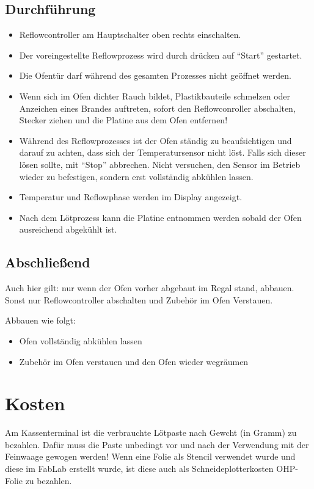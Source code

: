 \documentclass{\basedir/fablab-document}
\begin{document}
\subsection{Durchführung}
\begin{itemize}
	\item Reflowcontroller am Hauptschalter oben rechts einschalten.
	\item Der voreingestellte Reflowprozess wird durch drücken auf \enquote{Start} gestartet.
	\item Die Ofentür darf während des gesamten Prozesses nicht geöffnet werden.
	\item Wenn sich im Ofen dichter Rauch bildet, Plastikbauteile schmelzen oder Anzeichen eines Brandes auftreten, sofort den Reflowconroller abschalten, Stecker ziehen und die Platine aus dem Ofen entfernen!
	\item Während des Reflowprozesses ist der Ofen ständig zu beaufsichtigen und darauf zu achten, dass sich der Temperatursensor nicht löst. Falls sich dieser lösen sollte, mit \enquote{Stop} abbrechen. Nicht versuchen, den Sensor im Betrieb wieder zu befestigen, sondern erst vollständig abkühlen lassen.
	\item Temperatur und Reflowphase werden im Display angezeigt.
	\item Nach dem Lötprozess kann die Platine entnommen werden sobald der Ofen ausreichend abgekühlt ist.
\end{itemize}
\subsection{Abschließend}
Auch hier gilt: nur wenn der Ofen vorher abgebaut im Regal stand, abbauen. Sonst nur Reflowcontroller abschalten und Zubehör im Ofen Verstauen.

Abbauen wie folgt:
\begin{itemize}
	\item Ofen vollständig abkühlen lassen
	\item Zubehör im Ofen verstauen und den Ofen wieder wegräumen
\end{itemize}



\section{Kosten}
Am Kassenterminal ist die verbrauchte Lötpaste nach Gewcht (in Gramm) zu bezahlen. Dafür muss die Paste unbedingt vor und nach der Verwendung mit der Feinwaage gewogen werden! Wenn eine Folie als Stencil verwendet wurde und diese im FabLab erstellt wurde, ist diese auch als Schneideplotterkosten OHP-Folie zu bezahlen.


\end{document}

